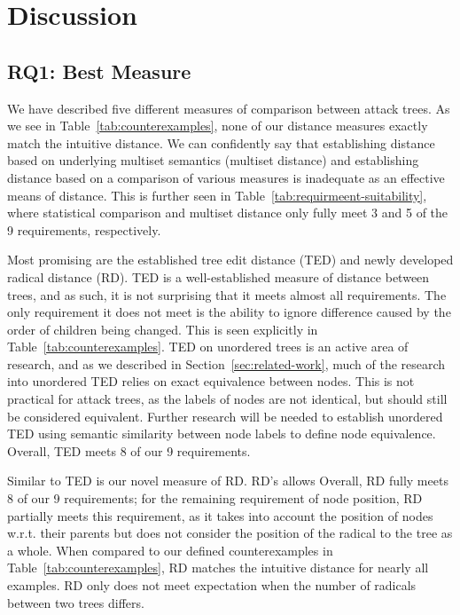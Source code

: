 \section{Discussion}
\label{sec:dicsussion}


\subsection{RQ1: Best Measure}

We have described five different measures of comparison between attack trees. As we see in Table~\ref{tab:counterexamples}, none of our distance measures exactly match the intuitive distance. We can confidently say that establishing distance based on underlying multiset semantics (multiset distance) and establishing distance based on a comparison of various measures is inadequate as an effective means of distance. This is further seen in Table~\ref{tab:requirmeent-suitability}, where statistical comparison and multiset distance only fully meet 3 and 5 of the 9 requirements, respectively.

Most promising are the established tree edit distance (TED) and newly developed radical distance (RD). TED is a well-established measure of distance between trees, and as such, it is not surprising that it meets almost all requirements. The only requirement it does not meet is the ability to ignore difference caused by the order of children being changed. This is seen explicitly in Table~\ref{tab:counterexamples}. TED on unordered trees is an active area of research, and as we described in Section~\ref{sec:related-work}, much of the research into unordered TED relies on exact equivalence between nodes. This is not practical for attack trees, as the labels of nodes are not identical, but should still be considered equivalent. Further research will be needed to establish unordered TED using semantic similarity between node labels to define node equivalence. Overall, TED meets 8 of our 9 requirements.

Similar to TED is our novel measure of RD. RD's allows Overall, RD fully meets 8 of our 9 requirements; for the remaining requirement of node position, RD partially meets this requirement, as it takes into account the position of nodes w.r.t. their parents but does not consider the position of the radical to the tree as a whole. When compared to our defined counterexamples in Table~\ref{tab:counterexamples}, RD matches the intuitive distance for nearly all examples. RD only does not meet expectation when the number of radicals between two trees differs.

